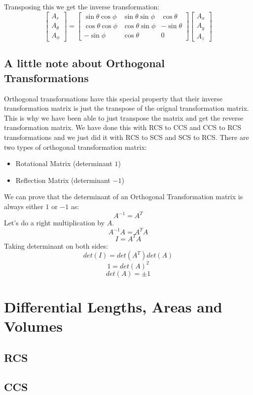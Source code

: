             Transposing this we get the inverse transformation:
            \begin{equation}
                \begin{bmatrix}
                    A_r \\ A_\theta \\ A_\phi    
                \end{bmatrix}
                =
                \begin{bmatrix}
                    \sin\theta\cos\phi & \sin\theta\sin\phi & \cos\theta \\
                    \cos\theta\cos\phi & \cos\theta\sin\phi & -\sin\theta \\
                    -\sin\phi & \cos\theta & 0
                \end{bmatrix}
                \begin{bmatrix}
                    A_x \\ A_y \\ A_z
                \end{bmatrix}
            \end{equation}
        \subsection{A little note about Orthogonal Transformations}
            Orthogonal transformations have this special property that their inverse transformation matrix is just the transpose of the orignal transformation matrix. This is why we have been able to just transpose the matrix and get the reverse transformation matrix. We have done this with RCS to CCS and CCS to RCS transformations and we just did it with RCS to SCS and SCS to RCS. 
            There are two types of orthogonal transformation matrix:
            \begin{itemize}
                \item Rotational Matrix (determinant $1$)
                \item Reflection Matrix (determinant $-1$)
            \end{itemize}
            We can prove that the determinant of an Orthogonal Transformation matrix is always either $1$ or $-1$ as:
            $$A^{-1} = A^T$$
            Let's do a right multiplication by $A$.
            $$A^{-1}A = A^TA$$
            $$I = A^TA$$
            Taking determinant on both sides:
            $$det(I) = det(A^T)det(A)$$
            $$1 = {det(A)}^2$$
            $$det(A) = \pm 1$$
    \section{Differential Lengths, Areas and Volumes}
        \subsection{RCS}
            
        \subsection{CCS}
            